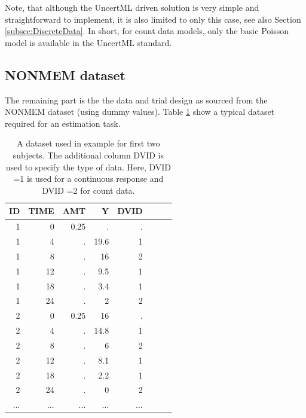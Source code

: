 Note, that although the UncertML driven solution is very simple and straightforward
to implement, it is also limited to only this case, see also Section \ref{subsec:DiscreteData}. 
In short, for count data models, only the basic Poisson model is available in the UncertML standard.


\subsection{NONMEM dataset}
\label{sec:eg6-NONMEMdataset}
The remaining part is the the data and trial design as sourced from the 
NONMEM dataset (using dummy values). Table \ref{tab:example6_dataSet} show a typical dataset required for 
an estimation task.
\begin{table}[htdp]
\begin{center}
\small
\renewcommand{\arraystretch}{1.1}%
\begin{tabular}{rrrrrrrr}\toprule
ID 	& TIME	& AMT	& Y		& DVID \\ \midrule
1 	& 0 		& 0.25 	& . 		& . \\ 
1 	& 4 		& . 		& 19.6 	& 1 \\ 
1 	& 8 		& . 		& 16 	& 2 \\ 
1 	& 12 	& . 		& 9.5 	& 1 \\ 
1 	& 18 	& . 		& 3.4 	& 1 \\ 
1 	& 24 	& . 		& 2 		& 2 \\ 
2 	& 0 		& 0.25	& 16 	& . \\ 
2 	& 4 		& . 		& 14.8 	& 1 \\ 
2 	& 8 		& . 		& 6 		& 2 \\ 
2 	& 12 	& . 		& 8.1 	& 1 \\ 
2 	& 18 	& . 		& 2.2 	& 1 \\ 
2 	& 24 	& . 		& 0 		& 2 \\ 
...	& ...		& ...		& ...		& ...	\\ \bottomrule
\end{tabular}
\end{center}
\caption{A dataset used in example for first two subjects.
The additional column DVID is used to specify the type of data. Here, 
DVID =1 is used for a continuous response and DVID =2 for count data.}
\label{tab:example6_dataSet}
\end{table}%

